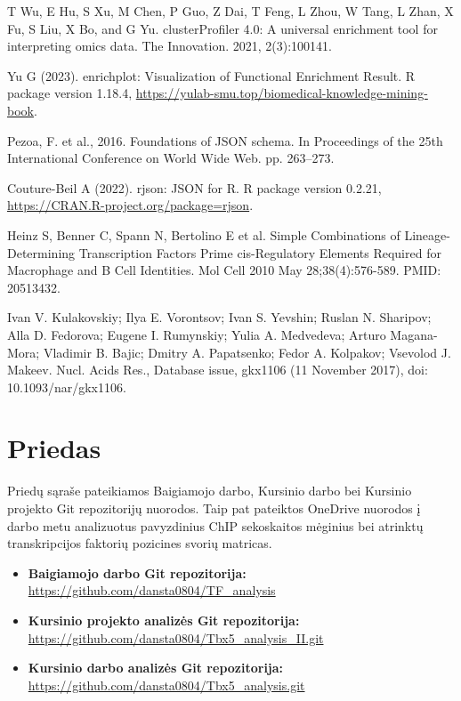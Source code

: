 \documentclass[12pt]{article}
\begin{document}
\begin{thebibliography}{99}
 T Wu, E Hu, S Xu, M Chen, P Guo, Z Dai, T Feng,
L Zhou, W Tang, L Zhan, X Fu, S Liu, X Bo, and G Yu. clusterProfiler 4.0:
A universal enrichment tool for interpreting omics data. The Innovation. 2021,
2(3):100141.

 Yu G (2023). enrichplot: Visualization of Functional
Enrichment Result. R package version 1.18.4, \newline
\url{https://yulab-smu.top/biomedical-knowledge-mining-book}.

 Pezoa, F. et al., 2016. Foundations of JSON schema. In
Proceedings of the 25th International Conference on World Wide Web. pp. 263–273.

 Couture-Beil A (2022). rjson: JSON for R. R package version
0.2.21, \newline
\url{https://CRAN.R-project.org/package=rjson}.

 Heinz S, Benner C, Spann N, Bertolino E et al. Simple
Combinations of Lineage-Determining Transcription Factors Prime cis-Regulatory
Elements Required for Macrophage and B Cell Identities. Mol Cell 2010 May
28;38(4):576-589. PMID: 20513432.

 Ivan V. Kulakovskiy; Ilya E. Vorontsov; Ivan S. Yevshin;
Ruslan N. Sharipov; Alla D. Fedorova; Eugene I. Rumynskiy; Yulia A. Medvedeva;
Arturo Magana-Mora; Vladimir B. Bajic; Dmitry A. Papatsenko; Fedor A. Kolpakov;
Vsevolod J. Makeev. Nucl. Acids Res., Database issue, gkx1106
(11 November 2017), doi: 10.1093/nar/gkx1106.

\end{thebibliography}
\newpage


\section{Priedas} \label{Priedas}
Priedų sąraše pateikiamos Baigiamojo darbo, Kursinio darbo bei Kursinio projekto
Git repozitorijų nuorodos. Taip pat pateiktos OneDrive nuorodos į
darbo metu analizuotus pavyzdinius ChIP sekoskaitos mėginius bei atrinktų
transkripcijos faktorių pozicines svorių matricas.

\begin{itemize}
    \item \textbf{Baigiamojo darbo Git repozitorija:}\\
        \url{https://github.com/dansta0804/TF\_analysis}
    \item \textbf{Kursinio projekto analizės Git repozitorija:}\\
        \url{https://github.com/dansta0804/Tbx5\_analysis\_II.git}
    \item \textbf{Kursinio darbo analizės Git repozitorija:}\\
        \url{https://github.com/dansta0804/Tbx5\_analysis.git}
\end{itemize}
\end{document}
